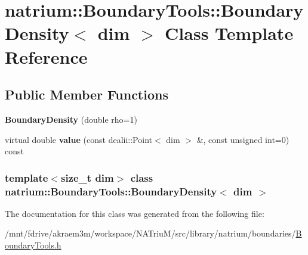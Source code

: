 \hypertarget{classnatrium_1_1BoundaryTools_1_1BoundaryDensity}{
\section{natrium::BoundaryTools::BoundaryDensity$<$ dim $>$ Class Template Reference}
\label{classnatrium_1_1BoundaryTools_1_1BoundaryDensity}
}
\subsection*{Public Member Functions}
\begin{DoxyCompactItemize}
\item 
\hypertarget{classnatrium_1_1BoundaryTools_1_1BoundaryDensity_a0f8244f4ff72a645949c7baa1a430612}{
{\bfseries BoundaryDensity} (double rho=1)}
\label{classnatrium_1_1BoundaryTools_1_1BoundaryDensity_a0f8244f4ff72a645949c7baa1a430612}

\item 
\hypertarget{classnatrium_1_1BoundaryTools_1_1BoundaryDensity_a236c2f5c29f91b154beb4977e3f8c379}{
virtual double {\bfseries value} (const dealii::Point$<$ dim $>$ \&, const unsigned int=0) const }
\label{classnatrium_1_1BoundaryTools_1_1BoundaryDensity_a236c2f5c29f91b154beb4977e3f8c379}

\end{DoxyCompactItemize}
\subsubsection*{template$<$size\_\-t dim$>$ class natrium::BoundaryTools::BoundaryDensity$<$ dim $>$}



The documentation for this class was generated from the following file:\begin{DoxyCompactItemize}
\item 
/mnt/fdrive/akraem3m/workspace/NATriuM/src/library/natrium/boundaries/\hyperlink{BoundaryTools_8h}{BoundaryTools.h}\end{DoxyCompactItemize}
